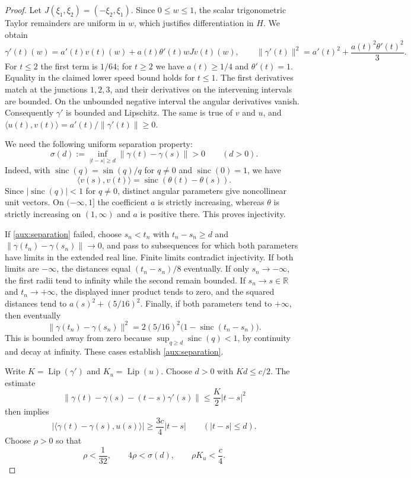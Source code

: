 \documentclass[11pt]{article}
\newcommand{\R}{\mathbb R}
\newcommand{\norm}[1]{\lVert #1\rVert}
\newcommand{\ip}[2]{\langle #1,#2\rangle}
\DeclareMathOperator{\Lip}{Lip}
\theoremstyle{definition}
\numberwithin{equation}{section}
\begin{document}
\begin{proof}
Let $J(\xi_1,\xi_2)=(-\xi_2,\xi_1)$. Since $0\le w\le1$, the
scalar trigonometric Taylor remainders are uniform in $w$, which
justifies differentiation in $H$. We obtain
\[
 \gamma'(t)(w)=a'(t)v(t)(w)+a(t)\theta'(t)wJv(t)(w),
 \qquad
 \norm{\gamma'(t)}^2=a'(t)^2+\frac{a(t)^2\theta'(t)^2}{3}.
\]
For $t\le2$ the first term is $1/64$; for $t\ge2$ we have
$a(t)\ge1/4$ and $\theta'(t)=1$. Equality in the claimed lower speed
bound holds for $t\le1$. The first derivatives match at the junctions
$1,2,3$, and their derivatives on the intervening intervals are bounded.
On the unbounded negative interval the angular derivatives vanish.
Consequently $\gamma'$ is bounded and Lipschitz. The same is true of
$v$ and $u$, and
$\ip{u(t)}{v(t)}=a'(t)/\norm{\gamma'(t)}\ge0$.

We need the following uniform separation property:
\begin{equation}\label{aux:separation}
 \sigma(d):=\inf_{|t-s|\ge d}\norm{\gamma(t)-\gamma(s)}>0
 \qquad(d>0).
\end{equation}
Indeed, with $\operatorname{sinc}(q)=\sin(q)/q$ for $q\ne0$ and
$\operatorname{sinc}(0)=1$, we have
\[
 \ip{v(s)}{v(t)}=\operatorname{sinc}(\theta(t)-\theta(s)).
\]
Since $|\operatorname{sinc}(q)|<1$ for $q\ne0$, distinct angular
parameters give noncollinear unit vectors. On $(-\infty,1]$ the
coefficient $a$ is strictly increasing, whereas $\theta$ is strictly
increasing on $(1,\infty)$ and $a$ is positive there. This proves
injectivity.

If \eqref{aux:separation} failed, choose $s_n<t_n$ with
$t_n-s_n\ge d$ and $\norm{\gamma(t_n)-\gamma(s_n)}\to0$, and pass to
subsequences for which both parameters have limits in the extended real
line. Finite limits contradict injectivity. If both limits are
$-\infty$, the distances equal $(t_n-s_n)/8$ eventually. If only
$s_n\to-\infty$, the first radii tend to infinity while the second
remain bounded. If $s_n\to s\in\R$ and $t_n\to+\infty$, the displayed
inner product tends to zero, and the squared distances tend to
$a(s)^2+(5/16)^2$. Finally, if both parameters tend to $+\infty$, then
eventually
\[
 \norm{\gamma(t_n)-\gamma(s_n)}^2
 =2(5/16)^2\bigl(1-\operatorname{sinc}(t_n-s_n)\bigr).
\]
This is bounded away from zero because
$\sup_{q\ge d}\operatorname{sinc}(q)<1$, by continuity and decay at
infinity. These cases establish \eqref{aux:separation}.

Write $K=\Lip(\gamma')$ and $K_u=\Lip(u)$. Choose $d>0$ with
$Kd\le c/2$. The estimate
\[
 \norm{\gamma(t)-\gamma(s)-(t-s)\gamma'(s)}
 \le\frac K2|t-s|^2
\]
then implies
\begin{equation}\label{aux:tangent}
 |\ip{\gamma(t)-\gamma(s)}{u(s)}|
 \ge\frac{3c}{4}|t-s|
 \qquad(|t-s|\le d).
\end{equation}
Choose $\rho>0$ so that
\begin{equation}\label{aux:radius}
 \rho<\frac1{32},\qquad 4\rho<\sigma(d),\qquad \rho K_u<\frac c4.
\end{equation}


\end{proof}
\end{document}
